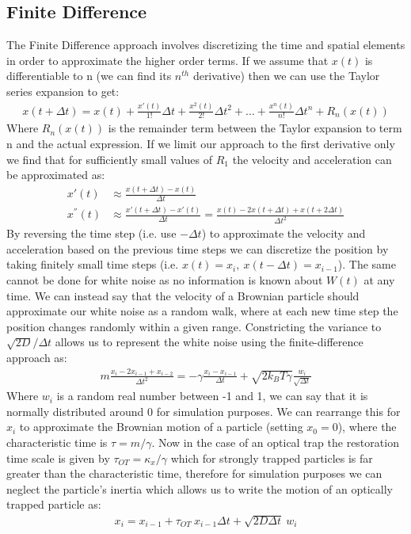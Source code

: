 \subsection{Finite Difference}
The Finite Difference approach involves discretizing the time and spatial elements in order to approximate the higher order terms. If we assume that $x(t)$ is differentiable to n (we can find its $n^{th}$ derivative) then we can use the Taylor series expansion to get:
\begin{align}
	x(t+\Delta t) = x(t)+\frac{x'(t)}{1!}\Delta t + \frac{x^2(t)}{2!}\Delta t^2+...+\frac{x^n(t)}{n!}\Delta t^n+R_n(x(t))	
\end{align}
Where $R_n(x(t))$ is the remainder term between the Taylor expansion to term n and the actual expression. If we limit our approach to the first derivative only we find that for sufficiently small values of $R_1$ the velocity and acceleration can be approximated as:
\begin{align}
	x'(t) &\approx \frac{x(t+\Delta t)-x(t)}{\Delta t}
	\\
	x^{''}(t) &\approx \frac{x'(t+\Delta t)-x'(t)}{\Delta t} = \frac{x(t)-2x(t+\Delta t)+x(t+2\Delta t)}{\Delta t^2}
\end{align}
By reversing the time step (i.e. use $-\Delta t$) to approximate the velocity and acceleration based on the previous time steps we can discretize the position by taking finitely small  time steps (i.e. $x(t) = x_i,\ x(t-\Delta t) = x_{i-1}$). The same cannot be done for white noise as no information is known about $W(t)$ at any time. We can instead say that the velocity of a Brownian particle should approximate our white noise as a random walk, where at each new time step the position changes randomly within a given range. Constricting the variance to $\sqrt{2D}/\Delta t$ allows us to represent the white noise using the finite-difference approach as:
\begin{align}
	m\frac{x_i-2x_{i-1}+x_{i-2}}{\Delta t^2} = -\gamma\frac{x_i-x_{i-1}}{\Delta t}+\sqrt{2k_BT\gamma}\frac{w_i}{\sqrt{\Delta t}}
\end{align}
Where $w_i$ is a random real number between -1 and 1, we can say that it is normally distributed around 0 for simulation purposes. We can rearrange this for $x_i$ to approximate the Brownian motion of a particle (setting $x_0=0$), where the characteristic time is $\tau = m/\gamma$. Now in the case of an optical trap the restoration time scale is given by $\tau_{OT}=\kappa_x/\gamma$ which for strongly trapped particles is far greater than the characteristic time, therefore for simulation purposes we can neglect the particle's inertia which allows us to write the motion of an optically trapped particle as:
\begin{align}
	\label{eq:sim_langevin}
	x_i = x_{i-1} + \tau_{OT}\ x_{i-1}\Delta t + \sqrt{2D\Delta t}\ w_i
\end{align} 

